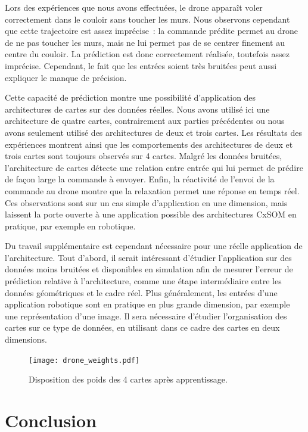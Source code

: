 \documentclass[../main]{subfiles}
\begin{document}
Lors des expériences que nous avons effectuées, le drone apparaît voler correctement dans le couloir sans toucher les murs. Nous observons cependant que cette trajectoire est assez imprécise~: la commande prédite permet au drone de ne pas toucher les murs, mais ne lui permet pas de se centrer finement au centre du couloir.
La prédiction est donc correctement réalisée, toutefois assez imprécise. 
Cependant, le fait que les entrées soient très bruitées peut aussi expliquer le manque de précision. 


Cette capacité de prédiction montre une possibilité d'application des architectures de cartes sur des données réelles. Nous avons utilisé ici une architecture de quatre cartes, contrairement aux parties précédentes ou nous avons seulement utilisé des architectures de deux et trois cartes. 
Les résultats des expériences montrent ainsi que les comportements des architectures de deux et trois cartes sont toujours observés sur 4 cartes.
Malgré les données bruitées, l'architecture de cartes détecte une relation entre entrée qui lui permet de prédire de façon large la commande à envoyer.
Enfin, la réactivité de l'envoi de la commande au drone montre que la relaxation permet une réponse en temps réel.
Ces observations sont sur un cas simple d'application en une dimension, mais laissent la porte ouverte à une application possible des architectures CxSOM en pratique, par exemple en robotique.

Du travail supplémentaire est cependant nécessaire pour une réelle application de l'architecture.
Tout d'abord, il serait intéressant d'étudier l'application sur des données moins bruitées et disponibles en simulation afin de mesurer l'erreur de prédiction relative à l'architecture, comme une étape intermédiaire entre les données géométriques et le cadre réel. 
Plus généralement, les entrées d'une application robotique sont en pratique en plus grande dimension, par exemple une représentation d'une image. Il sera nécessaire d'étudier l'organisation des cartes sur ce type de données, en utilisant dans ce cadre des cartes en deux dimensions.

\begin{figure}
\texttt{[image: drone\_weights.pdf]}
\caption{Disposition des poids des 4 cartes après apprentissage.}
\label{fig:drone_w}
\end{figure}

\section{Conclusion}
\end{document}

